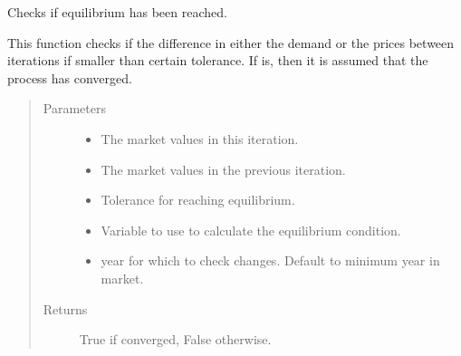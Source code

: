 \documentclass[letterpaper,10pt,english]{sphinxmanual}
\begin{document}
\begin{fulllineitems}
\label{\detokenize{api:muse.mca.check_equilibrium}}
Checks if equilibrium has been reached.

This function checks if the difference in either the demand or the prices between
iterations if smaller than certain tolerance. If is, then it is assumed that
the process has converged.
\begin{quote}\begin{description}
\item[{Parameters}] \leavevmode\begin{itemize}
\item {} 
 \textendash{} The market values in this iteration.

\item {} 
 \textendash{} The market values in the previous iteration.

\item {} 
 \textendash{} Tolerance for reaching equilibrium.

\item {} 
 \textendash{} Variable to use to calculate the equilibrium condition.

\item {} 
 \textendash{} year for which to check changes. Default to minimum year in market.

\end{itemize}

\item[{Returns}] \leavevmode
True if converged, False otherwise.

\end{description}\end{quote}

\end{fulllineitems}
\end{document}
